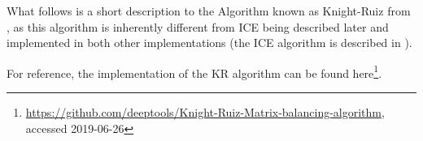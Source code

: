
What follows is a short description to the Algorithm known as Knight-Ruiz from
\cite{knight2013fast}, as this algorithm is inherently different from ICE being
described later and implemented in both other implementations
(the ICE algorithm is described in ).






For reference, the implementation of the KR algorithm can be found here\footnote{\url{https://github.com/deeptools/Knight-Ruiz-Matrix-balancing-algorithm}, accessed 2019-06-26}.










